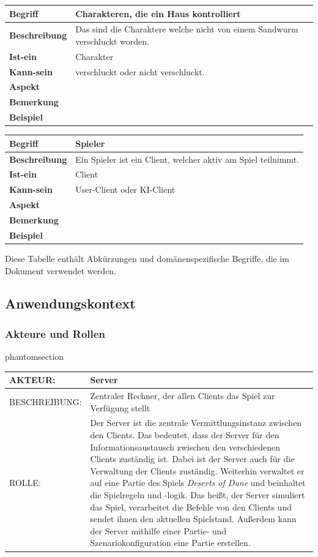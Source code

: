 \documentclass{uulm-assignment}
\makeatletter
\newcommand{\labeltext}[2]{%
  \@bsphack
  \csname phantomsection\endcsname %
  \def\@currentlabel{#1}{\label{#2}}%
  \@esphack
}
\newcommand{\akteur}[4]{
\labeltext{#2}{#1}
\begin{tabularx}{16cm}{|l|X|}
\hline 
AKTEUR: & #2 \\
\hline
BESCHREIBUNG: & #3 \\
\hline
ROLLE: & #4 \\ 
\hline
\end{tabularx}
}
\makeatother
\begin{document}
\begin{tabularx}{16cm}{|l|X|}
\hline
\textbf{Begriff} & \textbf{Charakteren, die ein Haus kontrolliert } \\
\hline
\textbf{Beschreibung} & Das sind die Charaktere welche nicht von einem Sandwurm verschluckt worden. \\
\hline
\textbf{Ist-ein} & Charakter\\
\hline
\textbf{Kann-sein} & verschluckt oder nicht verschluckt.\\
\hline
\textbf{Aspekt} &  \\
\hline
\textbf{Bemerkung} & \\
\hline
\textbf{Beispiel} & \\
\hline
\end{tabularx}

\begin{tabularx}{16cm}{|l|X|}
\hline
\textbf{Begriff} & \textbf{Spieler} \\
\hline
\textbf{Beschreibung} & Ein Spieler ist ein Client, welcher aktiv am Spiel teilnimmt.  \\
\hline
\textbf{Ist-ein} & Client\\
\hline
\textbf{Kann-sein} & User-Client oder KI-Client\\
\hline
\textbf{Aspekt} &  \\
\hline
\textbf{Bemerkung} & \\
\hline
\textbf{Beispiel} & \\
\hline
\end{tabularx}


Diese Tabelle enthält Abkürzungen und domänenspezifische Begriffe, die im Dokument verwendet
werden.

\subsection{Anwendungskontext}
\subsubsection{Akteure und Rollen}

\akteur{A-Server}{Server}{Zentraler Rechner, der allen Clients das Spiel zur Verfügung stellt}{Der Server ist die zentrale Vermittlungsinstanz zwischen den Clients. Das bedeutet, dass der Server für den Informationsaustausch zwischen den verschiedenen Clients zuständig ist. Dabei ist der Server auch für die Verwaltung der Clients zuständig. Weiterhin verwaltet er auf eine Partie des Spiels \textit{Deserts of Dune} und beinhaltet die Spielregeln und -logik. Das heißt, der Server simuliert das Spiel, verarbeitet die Befehle von den Clients und sendet ihnen den aktuellen Spielstand. Außerdem kann der Server mithilfe einer Partie- und Szenariokonfiguration eine Partie erstellen.}
\end{document}
